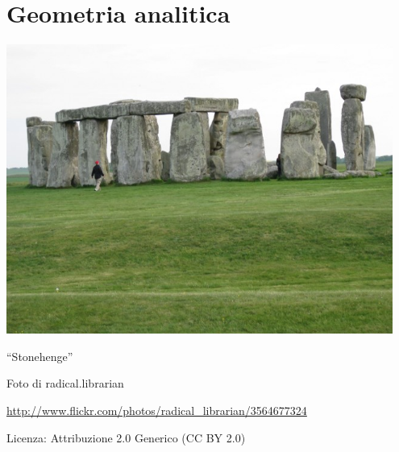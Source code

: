 
\part{Geometria analitica}

\includegraphics[width=0.95\textwidth]{img/Stonehenge.jpg}
  \begin{center}
    {\large ``Stonehenge''}\par
    Foto di radical.librarian\par
    \url{http://www.flickr.com/photos/radical_librarian/3564677324}\par
    Licenza: Attribuzione 2.0 Generico (CC BY 2.0)\par
  \end{center}
\clearpage
\cleardoublepage
